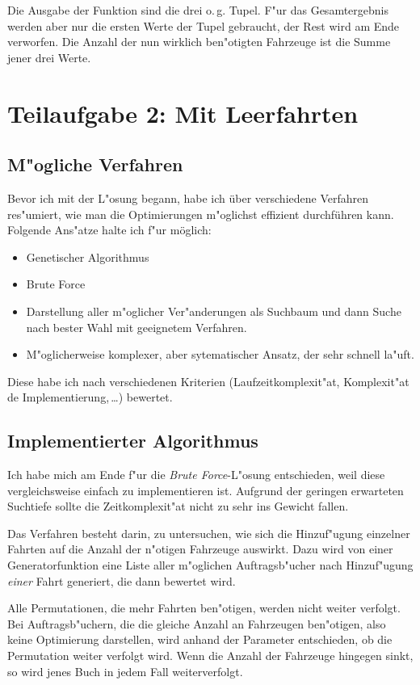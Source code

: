 \documentclass{scrreprt}
\begin{document}
Die Ausgabe der Funktion sind die drei o.\,g. Tupel. F"ur das Gesamtergebnis
werden aber nur die ersten Werte der Tupel gebraucht, der Rest wird am Ende
verworfen. Die Anzahl der nun wirklich ben"otigten Fahrzeuge ist die Summe jener
drei Werte.

\chapter{Teilaufgabe 2: Mit Leerfahrten}

\section{M"ogliche Verfahren}
Bevor ich mit der L"osung begann, habe ich über verschiedene Verfahren
res"umiert, wie man die Optimierungen m"oglichst effizient durchführen kann.
Folgende Ans"atze halte ich f"ur möglich:

\begin{itemize}
\item Genetischer Algorithmus
\item Brute Force
\item Darstellung aller m"oglicher Ver"anderungen als Suchbaum und dann Suche
nach bester Wahl mit geeignetem Verfahren.
\item M"oglicherweise komplexer, aber sytematischer Ansatz, der sehr schnell
la"uft.
\end{itemize}
Diese habe ich nach verschiedenen Kriterien (Laufzeitkomplexit"at, Komplexit"at
de Implementierung,\,\dots ) bewertet.

\section{Implementierter Algorithmus}
Ich habe mich am Ende f"ur die \emph{Brute Force}-L"osung entschieden, weil
diese vergleichsweise einfach zu implementieren ist.  Aufgrund der geringen 
erwarteten Suchtiefe sollte die Zeitkomplexit"at nicht zu sehr ins Gewicht
fallen.

Das Verfahren besteht darin, zu untersuchen, wie sich die Hinzuf"ugung einzelner
Fahrten auf die Anzahl der n"otigen Fahrzeuge auswirkt.  Dazu wird von einer
Generatorfunktion eine Liste aller m"oglichen Auftragsb"ucher nach Hinzuf"ugung
\emph{einer} Fahrt generiert, die dann bewertet wird.

Alle Permutationen, die mehr Fahrten ben"otigen, werden nicht weiter verfolgt.
Bei Auftragsb"uchern, die die gleiche Anzahl an Fahrzeugen ben"otigen, also
keine Optimierung darstellen, wird anhand der Parameter entschieden, ob die
Permutation weiter verfolgt wird.  Wenn die Anzahl der Fahrzeuge hingegen sinkt,
so wird jenes Buch in jedem Fall weiterverfolgt.
\end{document}
